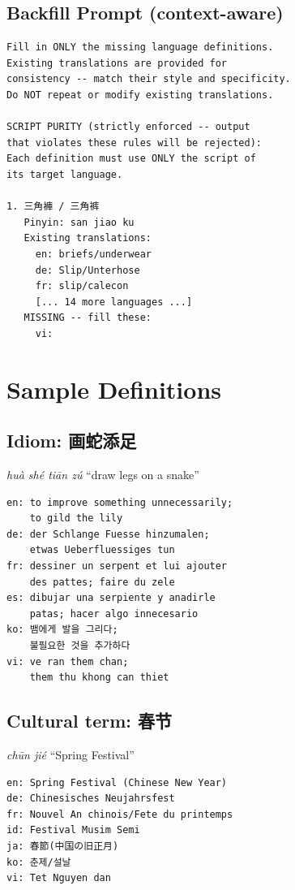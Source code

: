 \documentclass[11pt]{article}
\begin{document}
\subsection{Backfill Prompt (context-aware)}

\begin{lstlisting}
Fill in ONLY the missing language definitions.
Existing translations are provided for
consistency -- match their style and specificity.
Do NOT repeat or modify existing translations.

SCRIPT PURITY (strictly enforced -- output
that violates these rules will be rejected):
Each definition must use ONLY the script of
its target language.

1. 三角褲 / 三角裤
   Pinyin: san jiao ku
   Existing translations:
     en: briefs/underwear
     de: Slip/Unterhose
     fr: slip/calecon
     [... 14 more languages ...]
   MISSING -- fill these:
     vi:
\end{lstlisting}

\section{Sample Definitions}
\label{sec:appendix-samples}

\subsection{Idiom: 画蛇添足}
\textit{huà shé tiān zú} ``draw legs on a snake''

\begin{lstlisting}
en: to improve something unnecessarily;
    to gild the lily
de: der Schlange Fuesse hinzumalen;
    etwas Ueberfluessiges tun
fr: dessiner un serpent et lui ajouter
    des pattes; faire du zele
es: dibujar una serpiente y anadirle
    patas; hacer algo innecesario
ko: 뱀에게 발을 그리다;
    불필요한 것을 추가하다
vi: ve ran them chan;
    them thu khong can thiet
\end{lstlisting}

\subsection{Cultural term: 春节}
\textit{chūn jié} ``Spring Festival''

\begin{lstlisting}
en: Spring Festival (Chinese New Year)
de: Chinesisches Neujahrsfest
fr: Nouvel An chinois/Fete du printemps
id: Festival Musim Semi
ja: 春節(中国の旧正月)
ko: 춘제/설날
vi: Tet Nguyen dan
\end{lstlisting}
\end{document}
